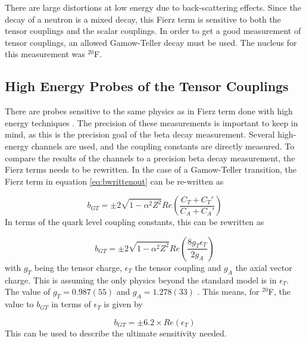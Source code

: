 \documentclass[../MaxHughesThesis.tex]{subfiles}
\begin{document}
There are large distortions at low energy due to back-scattering effects.
Since the decay of a neutron is a mixed decay, this Fierz term is sensitive to both the tensor couplings and the scalar couplings.
In order to get a good measurement of  tensor couplings, an allowed Gamow-Teller decay must be used. 
The nucleus for this measurement was $^{20}$F.

\subsection{High Energy Probes of the Tensor Couplings} 

There are probes sensitive to the same physics as in Fierz term done with high energy techniques \cite{Gon19}.
The precision of these measurements is important to keep in mind, as this is the precision goal of the beta decay measurement.
Several high-energy channels are used, and the coupling constants are directly measured.
To compare the results of the channels to a precision beta decay measurement, the Fierz terms needs to be rewritten.
In the case of a Gamow-Teller transition, the Fierz term in equation \ref{eq:bwrittenout} can be re-written as %

\begin{equation}
	b_{GT} = \pm 2 \sqrt{1 - \alpha^{2} Z^{2}} Re(\frac{C_{T} + C_{T}'}{C_{A} + C_{A}'})
	\label{eq:bgt}
\end{equation}
In terms of the quark level coupling constants, this can be rewritten as \cite{Gon19} %

\begin{equation}
	b_{GT} = \pm 2 \sqrt{1 - \alpha^{2} Z^{2}} Re(\frac{8 g_{T} \epsilon_{T}}{2 g_{A}})
	\label{eq:bgtquarklevel}
\end{equation}
with $g_{T}$ being the tensor charge, $\epsilon_{T}$ the tensor coupling and $g_{A}$ the axial vector charge.
This is assuming the only physics beyond the standard model is in $\epsilon_{T}$.
The value of $g_{T} = 0.987(55)$ and $g_{A} = 1.278 (33)$ \cite{Gon19}.
This means, for $^{20}$F, the value to $b_{GT}$ in terms of $\epsilon_{T}$ is given by %

\begin{equation}
	b_{GT} = \pm 6.2 \times Re(\epsilon_{T})
	\label{eq:bgtpropor}
\end{equation}
This can be used to describe the ultimate sensitivity needed.
\end{document}
